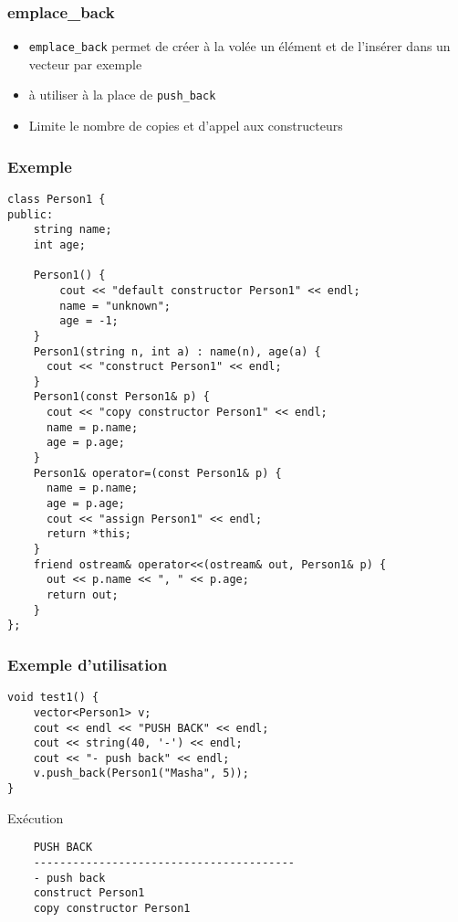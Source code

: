 \begin{frame}[fragile]
\frametitle{emplace\_back}
    \begin{itemize}
        \item \texttt{emplace\_back} permet de créer à la volée un élément et de l'insérer dans un vecteur par exemple 
        \item à utiliser à la place de \texttt{push\_back}
        \item Limite le nombre de copies et d'appel aux constructeurs
    \end{itemize}
\end{frame}

\begin{frame}[fragile]
\frametitle{Exemple}
\begin{lstlisting}
class Person1 {
public:
    string name;
    int age;
 
    Person1() {
        cout << "default constructor Person1" << endl;
        name = "unknown";
        age = -1;
    }
    Person1(string n, int a) : name(n), age(a) {
      cout << "construct Person1" << endl;
    } 
    Person1(const Person1& p) {
      cout << "copy constructor Person1" << endl;
      name = p.name;
      age = p.age;
    }      
    Person1& operator=(const Person1& p) {
      name = p.name;
      age = p.age;
      cout << "assign Person1" << endl;
      return *this;    
    }   
    friend ostream& operator<<(ostream& out, Person1& p) {
      out << p.name << ", " << p.age;
      return out;
    }
};
\end{lstlisting}
\end{frame}

\begin{frame}[fragile]
\frametitle{Exemple d'utilisation}
\begin{lstlisting}
void test1() {
    vector<Person1> v;
    cout << endl << "PUSH BACK" << endl;
    cout << string(40, '-') << endl;
    cout << "- push back" << endl;
    v.push_back(Person1("Masha", 5));
}
\end{lstlisting}
\begin{exampleblock}{Exécution}
{\tiny 
\begin{verbatim}
    PUSH BACK
    ----------------------------------------
    - push back
    construct Person1
    copy constructor Person1    
\end{verbatim}
}
\end{exampleblock}
\end{frame}


